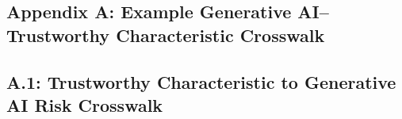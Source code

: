 \documentclass[fleqn]{article}
\begin{document}
\begin{landscape}
\thispagestyle{empty}	
\section*{Appendix A: Example Generative AI--Trustworthy Characteristic Crosswalk}\label{sec:appndxa}


\subsection*{A.1: Trustworthy Characteristic to Generative AI Risk Crosswalk}\label{sec:appndxa1}


\end{landscape}
\end{document}
